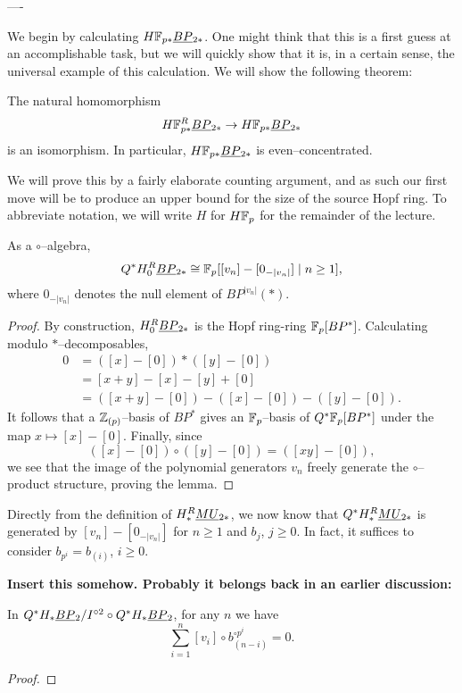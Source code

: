 ----

We begin by calculating $H\mathbb F_{p*} \smash{\underline{BP}}_{2*}$.  One might think that this is a first guess at an accomplishable task, but we will quickly show that it is, in a certain sense, the universal example of this calculation.  We will show the following theorem:
\begin{theorem}\label{HFpBPCooperationsTheorem}
The natural homomorphism \[H\mathbb F_{p*}^R \smash{\underline{BP}}_{2*} \to H\mathbb F_{p*} \smash{\underline{BP}}_{2*}\] is an isomorphism.  In particular, $H\mathbb F_{p*} \smash{\underline{BP}}_{2*}$ is even--concentrated.
\end{theorem}
\noindent We will prove this by a fairly elaborate counting argument, and as such our first move will be to produce an upper bound for the size of the source Hopf ring.  To abbreviate notation, we will write $H$ for $H\mathbb F_p$ for the remainder of the lecture.

\begin{lemma}
As a $\circ$--algebra, \[Q^* H_0^R \smash{\underline{BP}}_{2*} \cong \mathbb F_p[[v_n] - [0_{-|v_n|}] \mid n \ge 1],\] where $0_{-|v_n|}$ denotes the null element of $BP^{|v_n|}(*)$.
\end{lemma}
\begin{proof}
By construction, $H_0^R \smash{\underline{BP}}_{2*}$ is the Hopf ring-ring $\mathbb F_p[BP^*]$.  Calculating modulo $\ast$--decomposables,
\begin{align*}
0 & = ([x] - [0]) \ast ([y] - [0]) \\
& = [x + y] - [x] - [y] + [0] \\
& = ([x + y] - [0]) - ([x] - [0]) - ([y] - [0]).
\end{align*}
It follows that a $\mathbb Z_{(p)}$--basis of $BP^*$ gives an $\mathbb F_p$--basis of $Q^* \mathbb F_p[BP^*]$ under the map $x \mapsto [x] - [0]$.  Finally, since \[([x] - [0]) \circ ([y] - [0]) = ([xy] - [0]),\] we see that the image of the polynomial generators $v_n$ freely generate the $\circ$--product structure, proving the lemma.
\end{proof}

Directly from the definition of $H_*^R \smash{\underline{MU}}_{2*}$, we now know that $Q^* H_*^R \smash{\underline{MU}}_{2*}$ is generated by $[v_n] - [0_{-|v_n|}]$ for $n \ge 1$ and $b_j$, $j \ge 0$.  In fact, it suffices to consider $b_{p^i} = b_{(i)}$, $i \ge 0$.

\textbf{Insert this somehow. Probably it belongs back in an earlier discussion:}
\begin{lemma}
In $Q^* H_* \smash{\underline{BP}}_{2} / I^{\circ 2} \circ Q^* H_* \smash{\underline{BP}}_{2}$, for any $n$ we have \[\sum_{i=1}^n [v_i] \circ b_{(n-i)}^{\circ p^i} = 0.\]
\end{lemma}
\begin{proof}
\end{proof}

